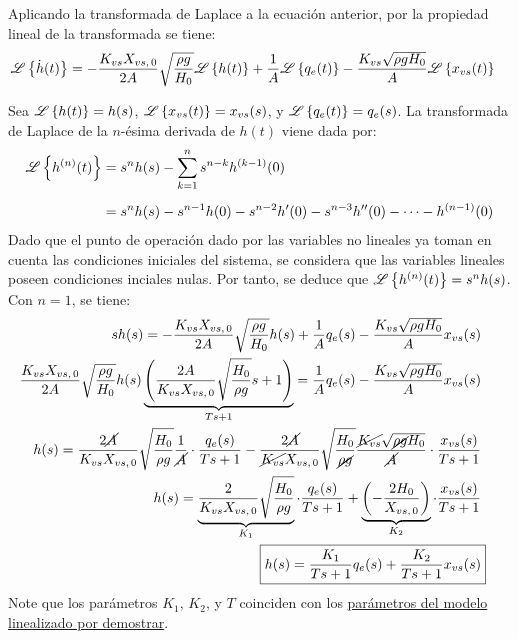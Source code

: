 Aplicando la transformada de Laplace a la ecuación anterior, por la propiedad lineal de la transformada se tiene:
\begin{align*}
    \mathscr{L}\left\{\dot{ h } (t)\right\}&=  - \frac{ K _{vs} X _{vs,\,0}}{2A} \sqrt{ \frac{\rho g}{ H _0}} \mathscr{L}\left\{h(t)\right\} +  \frac{1}{A} \mathscr{L}\left\{q _{e} (t)\right\} -\frac{K _{vs} \sqrt{\rho g H_0}}{A} \mathscr{L}\left\{x _{vs} (t)\right\}
\end{align*}

Sea $\mathscr{L}\left\{h(t)\right\}=h(s)$, $\mathscr{L}\left\{ x _{vs}(t)\right\} = x _{vs}(s)$, y $\mathscr{L}\left\{q _{e} (t)\right\} = q _{e} (s)$. La transformada de Laplace de la $n$-ésima derivada de $h(t)$ viene dada por:
\begin{align*}
    \mathscr{L}\left\{h^{(n)}(t)\right\}&=s^nh(s)-\sum_{k=1}^n s^{n-k}h^{(k-1)}(0)\\[0.5em]
    &=s^nh(s)-s^{n-1}h(0)-s^{n-2}h^\prime(0)-s^{n-3}h^{\prime\prime}(0)-\cdots-h^{(n-1)}(0)
\end{align*}
Dado que el punto de operación dado por las variables no lineales ya toman en cuenta las condiciones iniciales del sistema, se considera que las variables lineales poseen condiciones inciales nulas. Por tanto, se deduce que $\mathscr{L}\left\{h ^{(n)}(t)\right\} = s ^{n} h (s)$. Con $n = 1$, se tiene:
\begin{align*}
     sh(s) =  - \frac{ K _{vs} X _{vs,\,0}}{2A} \sqrt{ \frac{\rho g}{ H _0}} h (s) +  \frac{1}{A} q _{e} (s) -\frac{K _{vs} \sqrt{\rho g H_0}}{A} x _{vs} (s)\\
     \frac{ K _{vs} X _{vs,\,0}}{2A} \sqrt{ \frac{\rho g}{ H _0}} h(s)\underbrace{\left(\frac{2A}{K _{vs} X _{vs,\,0}} \sqrt{ \frac{H _{0}}{\rho g}}s+ 1\right)}_{Ts + 1} = \frac{1}{A} q _{e} (s) -\frac{K _{vs} \sqrt{\rho g H_0}}{A} x _{vs} (s)\\
     h(s) = \frac{2\cancel{A}}{K _{vs} X _{vs,\,0}} \sqrt{ \frac{H _{0}}{\rho g}}\frac{1}{\cancel{A}} \cdot \frac{q _{e}(s)}{Ts + 1} - \frac{2 \cancel{A}}{\cancel{K _{vs}} X _{vs,\,0}} \sqrt{ \frac{H _{0}}{\cancel{\rho g}}}\frac{\cancel{K _{vs}} \sqrt{\cancel{\rho g} H_0}}{\cancel{A}}\cdot\frac{x _{vs}(s)}{Ts + 1}\\
     h (s) = \underbrace{\frac{2}{K _{vs} X _{vs,\,0}} \sqrt{ \frac{H _{0}}{ \rho g}}}_{K_1} \cdot \frac{q _{e} (s)}{Ts + 1} + \underbrace{\left( -\frac{2H _{0}}{X _{vs,\,0}} \right)}_{K_2} \cdot \frac{x _{vs} (s)}{Ts + 1}\\
     \Aboxed{h (s) = \frac{K_1}{Ts +1 } q _{e} (s) + \frac{K_2}{Ts + 1} x _{vs}(s)}
\end{align*}
Note que los parámetros $K_1$, $K_2$, y $T$ coinciden con los \hyperref[eq3]{parámetros del modelo linealizado por demostrar}.
